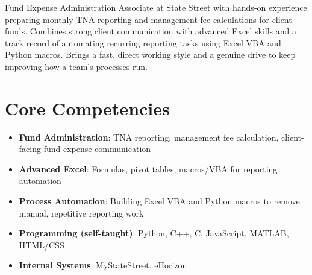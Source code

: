 \documentclass[11pt,a4paper,sans]{moderncv}
\begin{document}
\makecvtitle


\vspace{6pt}
\small{Fund Expense Administration Associate at State Street with hands-on experience preparing monthly TNA reporting and management fee calculations for client funds. Combines strong client communication with advanced Excel skills and a track record of automating recurring reporting tasks using Excel VBA and Python macros. Brings a fast, direct working style and a genuine drive to keep improving how a team's processes run.}


\section{Core Competencies}
\vspace{1pt}
\begin{itemize}

\item \textbf{Fund Administration}: TNA reporting, management fee calculation, client-facing fund expense communication

\item \textbf{Advanced Excel}: Formulas, pivot tables, macros/VBA for reporting automation

\item \textbf{Process Automation}: Building Excel VBA and Python macros to remove manual, repetitive reporting work

\item \textbf{Programming (self-taught)}: Python, C++, C, JavaScript, MATLAB, HTML/CSS

\item \textbf{Internal Systems}: MyStateStreet, eHorizon

\end{itemize}

\end{document}
